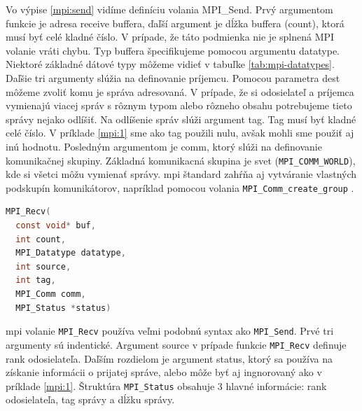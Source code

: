 Vo výpise \ref{mpi:send} vidíme definíciu volania MPI\_Send. Prvý argumentom funkcie je adresa receive buffera, ďaľší argument je dĺžka buffera (count), ktorá musí byť celé kladné číslo.
V prípade, že táto podmienka nie je splnená MPI volanie vráti chybu. Typ buffera špecifikujeme pomocou argumentu datatype.
Niektoré základné dátové typy môžeme vidieť v tabuľke \ref{tab:mpi-datatypes}.
Daľšie tri argumenty slúžia na definovanie príjemcu. Pomocou parametra dest môžeme zvoliť komu je správa adresovaná.
V prípade, že si odosielateľ a príjemca vymienajú viacej správ s rôznym typom alebo rôzneho obsahu potrebujeme tieto správy nejako odlíšiť.
Na odlíšenie správ slúži argument tag. Tag musí byť kladné celé číslo. V príklade \ref{mpi:1} sme ako tag použili nulu,
avšak mohli sme použiť aj inú hodnotu. Posledným argumentom je comm, ktorý slúži na definovanie komunikačnej skupiny.
Základná komunikacná skupina je svet (\texttt{MPI\_COMM\_WORLD}), kde si všetci môžu vymienať správy.
\acrshort{mpi} štandard zahŕňa aj vytváranie vlastných podskupín komunikátorov, napríklad pomocou volania \texttt{MPI\_Comm\_create\_group} \cite{mpi3-1}.

\begin{lstlisting}[language=c, caption={MPI\_Recv}, label={mpi:recv}]
  MPI_Recv(
  const void* buf,
  int count,
  MPI_Datatype datatype,
  int source,
  int tag,
  MPI_Comm comm,
  MPI_Status *status)
\end{lstlisting}

\acrshort{mpi} volanie \texttt{MPI\_Recv} používa veľmi podobnú syntax ako \texttt{MPI\_Send}. Prvé tri argumenty sú indentické.
Argument source v prípade funkcie \texttt{MPI\_Recv} definuje rank odosielateľa. Daľším rozdielom je argument status,
ktorý sa používa na získanie informácii o prijatej správe, alebo môže byť aj ingnorovaný ako v príklade \ref{mpi:1}.
Štruktúra \texttt{MPI\_Status} obsahuje 3 hlavné informácie: rank odosielateľa, tag správy a dĺžku správy.

